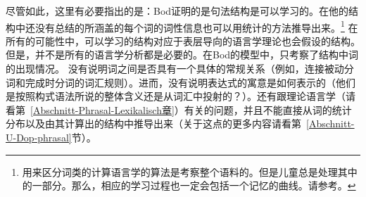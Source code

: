 尽管如此，这里有必要指出的是：Bod证明的是句法结构是可以学习的。在他的结构中还没有总结的所涵盖的每个词的词性信息也可以用统计的方法推导出来\citep{RCF98a,Clark2000a}。\footnote{
用来区分词类的计算语言学的算法是考察整个语料的。但是儿童总是处理其中的一部分。那么，相应的学习过程也一定会包括一个记忆的曲线。请参考。
}
在所有的可能性中，可以学习的结构对应于表层导向的语言学理论也会假设的结构。但是，并不是所有的语言学分析都是必要的。在Bod的模型中，只考察了结构中词的出现情况。
没有说明词之间是否具有一个具体的常规关系（例如，连接被动分词和完成时分词的词汇规则）。进而，没有说明表达式的寓意是如何表示的（他们是按照构式语法所说的整体含义还是从词汇中投射的？）。还有跟理论语言学（请看第~\ref{Abschnitt-Phrasal-Lexikalisch章}）有关的问题，并且不能直接从词的统计分布以及由其计算出的结构中推导出来（关于这点的更多内容请看第~\ref{Abschnitt-U-Dop-phrasal}节）。

